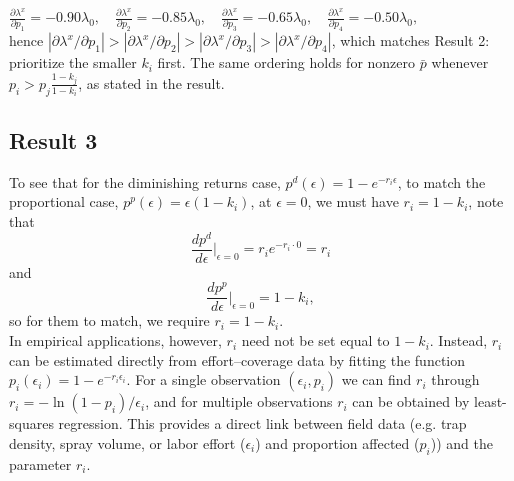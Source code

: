 \documentclass[onecolumn]{article}
\begin{document}
$\frac{\partial\lambda^x}{\partial p_1}=-0.90\lambda_0,\quad
\frac{\partial\lambda^x}{\partial p_2}=-0.85\lambda_0,\quad
\frac{\partial\lambda^x}{\partial p_3}=-0.65\lambda_0,\quad
\frac{\partial\lambda^x}{\partial p_4}=-0.50\lambda_0,$\\

\noindent hence $|\partial\lambda^x/\partial p_1|>|\partial\lambda^x/\partial p_2|>|\partial\lambda^x/\partial p_3|>|\partial\lambda^x/\partial p_4|$, which matches Result 2: prioritize the smaller $k_i$ first. The same ordering holds for nonzero $\bar p$ whenever $p_i>p_j\frac{1-k_j}{1-k_i}$, as stated in the result.

\subsection*{Result 3}
To see that for the diminishing returns case, $p^d(\epsilon) = 1 - e^{-r_i \epsilon}$, to match the proportional case, $p^p(\epsilon) = \epsilon(1 - k_i)$, at $\epsilon=0$, we must have $r_i = 1 - k_i$, note that
\begin{equation} \frac{dp^d}{d\epsilon}\bigg|_{\epsilon=0} = r_i e^{-r_i \cdot 0} = r_i \end{equation}
and
\begin{equation} \frac{dp^p}{d\epsilon}\bigg|_{\epsilon=0} = 1 - k_i, \end{equation}
so for them to match, we require $r_i = 1 - k_i$.\\

In empirical applications, however, $r_i$ need not be set equal to $1-k_i$. Instead, $r_i$ can be estimated directly from effort–coverage data by fitting the function $p_i(\epsilon_i) = 1 - e^{-r_i \epsilon_i}$. For a single observation $(\epsilon_i, p_i)$ we can find $r_i$ through $r_i = -\ln(1-p_i)/\epsilon_i$, and for multiple observations $r_i$ can be obtained by least-squares regression. This provides a direct link between field data (e.g. trap density, spray volume, or labor effort ($\epsilon_i$) and proportion affected ($p_i$)) and the parameter $r_i$.
\end{document}
